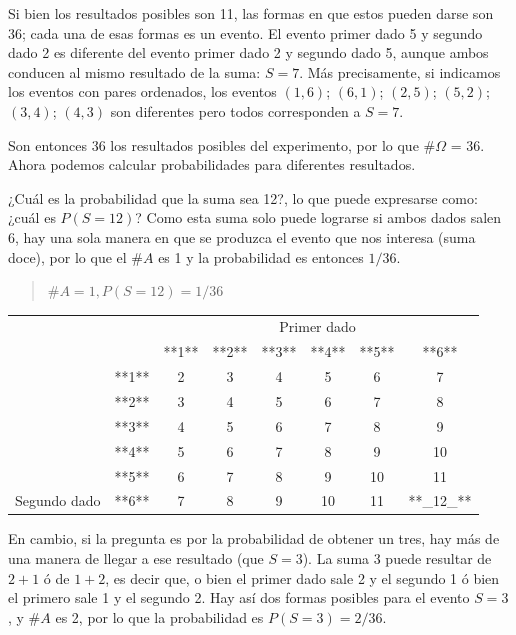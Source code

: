 \documentclass[]{book}
\begin{document}
Si bien los resultados posibles son 11, las formas en que estos pueden
darse son 36; cada una de esas formas es un evento. El evento primer
dado 5 y segundo dado 2 es diferente del evento primer dado 2 y segundo
dado 5, aunque ambos conducen al mismo resultado de la suma: \(S=7\). Más precisamente,
si indicamos los eventos con pares ordenados, los eventos \((1,6)\); \((6,1)\);
\((2,5)\); \((5,2)\); \((3,4)\); \((4,3)\) son diferentes pero todos corresponden a \(S=7\).

Son entonces 36 los resultados posibles del experimento, por lo que \(\#\Omega\)
= 36. Ahora podemos calcular probabilidades para diferentes resultados.

¿Cuál es la probabilidad que la suma sea 12?, lo que puede expresarse
como: ¿cuál es \(P(S=12)\)? Como esta suma solo puede lograrse si ambos
dados salen 6, hay una sola manera en que se produzca el evento que nos
interesa (suma doce), por lo que el \(\#A\) es 1 y la probabilidad es
entonces \(1/36\).

\begin{quote}
\(\#A = 1, P(S = 12)=1/36\)
\end{quote}

\begin{table}[H]
\centering
\begin{tabular}{lccccccc}
\toprule
\multicolumn{2}{c}{ } & \multicolumn{6}{c}{Primer dado} \\
\cmidrule(l{3pt}r{3pt}){3-8}
 &  & **1** & **2** & **3** & **4** & **5** & **6**\\
\midrule
\rowcolor{gray!6}   & **1** & 2 & 3 & 4 & 5 & 6 & 7\\
\cmidrule{2-8}
 & **2** & 3 & 4 & 5 & 6 & 7 & 8\\
\cmidrule{2-8}
\rowcolor{gray!6}   & **3** & 4 & 5 & 6 & 7 & 8 & 9\\
\cmidrule{2-8}
 & **4** & 5 & 6 & 7 & 8 & 9 & 10\\
\cmidrule{2-8}
\rowcolor{gray!6}   & **5** & 6 & 7 & 8 & 9 & 10 & 11\\
\cmidrule{2-8}
\multirow[t]{-6}{*}{\raggedright\arraybackslash Segundo dado} & **6** & 7 & 8 & 9 & 10 & 11 & **\_12\_**\\
\bottomrule
\end{tabular}
\end{table}

En cambio, si la pregunta es por la probabilidad de obtener un tres, hay
más de una manera de llegar a ese resultado (que \(S = 3\)). La suma 3 puede
resultar de \(2+1\) ó de \(1+2\), es decir que, o bien el primer dado sale 2 y
el segundo 1 ó bien el primero sale 1 y el segundo 2. Hay así dos formas
posibles para el evento \(S = 3\), y \(\#A\) es 2, por lo que la probabilidad es
\(P(S = 3) = 2/36\).
\end{document}
